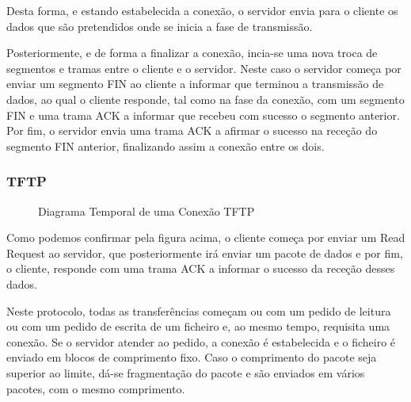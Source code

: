 \documentclass[11pt]{article}
\begin{document}
Desta forma, e estando estabelecida a conexão, o servidor envia para o cliente os dados que são pretendidos onde se inicia a fase de transmissão.

Posteriormente, e de forma a finalizar a conexão, incia-se uma nova troca de segmentos e tramas entre o cliente e o servidor. Neste caso o servidor começa por enviar um segmento FIN ao cliente a informar que terminou a transmissão de dados, ao qual o cliente responde, tal como na fase da conexão, com um segmento FIN e uma trama ACK a informar que recebeu com sucesso o segmento anterior. Por fim, o servidor envia uma trama ACK a afirmar o sucesso na receção do segmento FIN anterior, finalizando assim a conexão entre os dois.

\subsubsection{TFTP}

\begin{figure}[hbt!]
    \centering
    \caption{Diagrama Temporal de uma Conexão TFTP}
\end{figure}

Como podemos confirmar pela figura acima, o cliente começa por enviar um Read Request ao servidor, que posteriormente irá enviar um pacote de dados e por fim, o cliente, responde com uma trama ACK a informar o sucesso da receção desses dados.

Neste protocolo, todas as transferências começam ou com um pedido de leitura ou com um pedido de escrita de um ficheiro e, ao mesmo tempo, requisita uma conexão. Se o servidor atender ao pedido, a conexão é estabelecida e o ficheiro é enviado em blocos de comprimento fixo. Caso o comprimento do pacote seja superior ao limite, dá-se fragmentação do pacote e são enviados em vários pacotes, com o mesmo comprimento.


\clearpage
\end{document}
